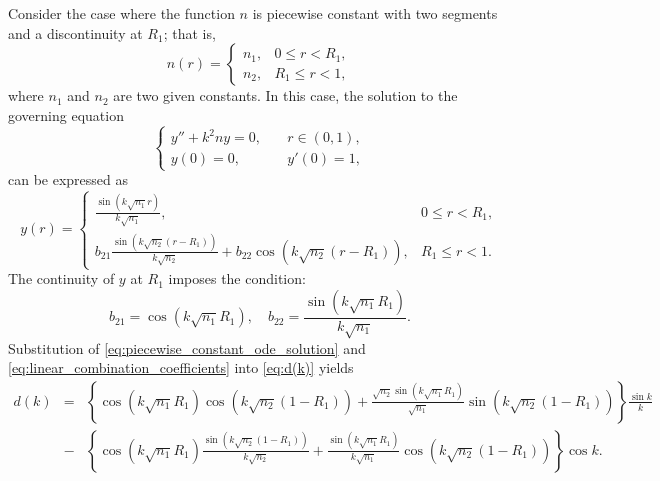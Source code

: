 \documentclass[11pt,reqno]{amsart}
\theoremstyle{definition}
\theoremstyle{remark}
\numberwithin{equation}{section}
\begin{document}
Consider the case where the function $n$ is piecewise constant with two segments and a discontinuity at $R_1$; that is,	
\begin{equation*}
	n(r) = \begin{cases}
		n_1, & 0 \leq r < R_1, \\
		n_2, & R_1 \leq r < 1,
	\end{cases}
	\nonumber
\end{equation*}
where $n_1$ and $n_2$ are two given constants. In this case, the solution to the governing equation
\begin{equation*}
	\left\{
	\begin{aligned}
		y'' + k^2 n y = 0, & \quad r \in (0, 1), \\
		y(0) = 0, & \quad y'(0) = 1,
	\end{aligned}
	\nonumber
	\right.
\end{equation*}
can be expressed as
\begin{equation}\label{eq:piecewise_constant_ode_solution}
	y(r) = \begin{cases}
	\displaystyle	\frac{\sin(k\sqrt{n_1}r)}{k\sqrt{n_1}}, & 0 \leq r < R_1, \\
	\displaystyle	b_{21} \frac{\sin(k\sqrt{n_2}(r - R_1))}{k\sqrt{n_2}}
            + b_{22} \cos(k\sqrt{n_2}(r - R_1)), & R_1 \leq r < 1.
	\end{cases}
\end{equation}	
The continuity of $y$ at $R_1$ imposes the condition:
\begin{equation}\label{eq:linear_combination_coefficients}
		b_{21} = \cos(k\sqrt{n_1} R_1), \quad
		b_{22} = \frac{\sin(k\sqrt{n_1} R_1)}{k\sqrt{n_1}}.
\end{equation}
Substitution of \eqref{eq:piecewise_constant_ode_solution} and \eqref{eq:linear_combination_coefficients} into \eqref{eq:d(k)} yields	
\begin{eqnarray}\label{eq:piecewise_constant_d(k)}
		d(k) &=& \left\{ \cos(k\sqrt{n_1} R_1) \cos(k\sqrt{n_2}(1 - R_1)) + \frac{\sqrt{n_2} \sin(k\sqrt{n_1} R_1)}{\sqrt{n_1}} \sin(k\sqrt{n_2}(1 - R_1)) \right\} \frac{\sin k}{k} \nonumber\\
		&- & \left\{ \cos(k\sqrt{n_1} R_1) \frac{\sin(k\sqrt{n_2}(1 - R_1))}{k\sqrt{n_2}} + \frac{\sin(k\sqrt{n_1} R_1)}{k\sqrt{n_1}} \cos(k\sqrt{n_2}(1 - R_1)) \right\} \cos k.
\end{eqnarray}
\end{document}
